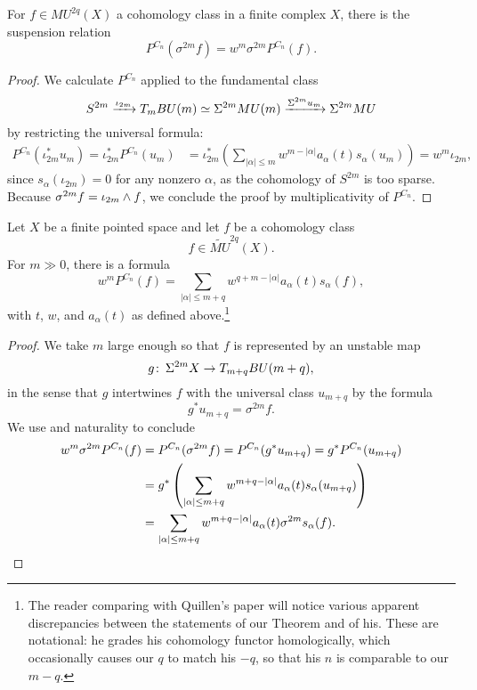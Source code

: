 \begin{lemma}\label{PowerOpnsOnSuspensions}
For \(f \in MU^{2q}(X)\) a cohomology class in a finite complex \(X\), there is the suspension relation \[P^{C_n}(\sigma^{2m} f) = w^m \sigma^{2m} P^{C_n}(f).\]
\end{lemma}
\begin{proof}
We calculate \(P^{C_n}\) applied to the fundamental class \[S^{2m} \xrightarrow{\iota_{2m}} T_m BU(m) \simeq \Sigma^{2m} MU(m) \xrightarrow{\Sigma^{2m} u_m} \Sigma^{2m} MU\] by restricting the universal formula:
\begin{align*}
P^{C_n}(\iota_{2m}^* u_m) = \iota_{2m}^* P^{C_n}(u_m) & = \iota_{2m}^* \left( \sum_{|\alpha| \le m} w^{m - |\alpha|} a_\alpha(t) s_\alpha(u_m) \right) = w^m \iota_{2m},
\end{align*}
since \(s_\alpha(\iota_{2m}) = 0\) for any nonzero \(\alpha\), as the cohomology of \(S^{2m}\) is too sparse.  Because \(\sigma^{2m} f = \iota_{2m} \wedge f\), we conclude the proof by multiplicativity of \(P^{C_n}\).
\end{proof}

\begin{theorem}\label{QuillensKeyRelation}
Let \(X\) be a finite pointed space and let \(f\) be a cohomology class \[f \in \widetilde{MU}^{2q}(X).\]  For \(m \gg 0\), there is a formula \[w^m P^{C_n}(f) = \sum_{|\alpha| \le m+q} w^{q+m - |\alpha|} a_\alpha(t) s_\alpha(f),\] with \(t\), \(w\), and \(a_\alpha(t)\) as defined above.\footnote{The reader comparing with Quillen's paper will notice various apparent discrepancies between the statements of our Theorem and of his.  These are notational: he grades his cohomology functor homologically, which occasionally causes our \(q\) to match his \(-q\), so that his \(n\) is comparable to our \(m-q\).}
\end{theorem}
\begin{proof}
We take \(m\) large enough so that \(f\) is represented by an unstable map \[g\colon\thinspace \Sigma^{2m} X \to T_{m+q} BU(m+q),\] in the sense that \(g\) intertwines \(f\) with the universal class \(u_{m+q}\) by the formula \[g^* u_{m+q} = \sigma^{2m} f.\]  We use  and naturality to conclude
\begin{align*}
w^m \sigma^{2m} P^{C_n}(f) & = P^{C_n}(\sigma^{2m} f) = P^{C_n}(g^* u_{m+q}) = g^* P^{C_n}(u_{m+q}) \\
& = g^* \left(\sum_{|\alpha| \le m+q} w^{m+q - |\alpha|} a_\alpha(t) s_\alpha(u_{m+q}) \right) \\
& = \sum_{|\alpha| \le m+q} w^{m+q - |\alpha|} a_\alpha(t) \sigma^{2m} s_\alpha(f). \qedhere
\end{align*}
\end{proof}

